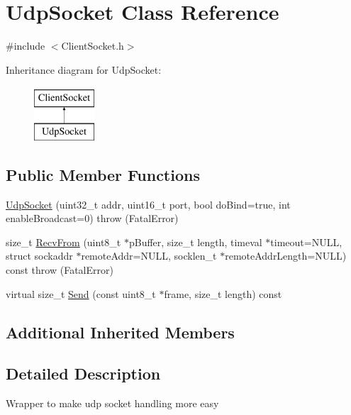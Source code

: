 \hypertarget{class_udp_socket}{\section{Udp\-Socket Class Reference}
\label{class_udp_socket}
}


{\ttfamily \#include $<$Client\-Socket.\-h$>$}

Inheritance diagram for Udp\-Socket\-:\begin{figure}[H]
\begin{center}
\leavevmode
\includegraphics[height=2.000000cm]{class_udp_socket}
\end{center}
\end{figure}
\subsection*{Public Member Functions}
\begin{DoxyCompactItemize}
\item 
\hyperlink{class_udp_socket_a017a02140e8618ce88f8d8c5a3bf2ba3}{Udp\-Socket} (uint32\-\_\-t addr, uint16\-\_\-t port, bool do\-Bind=true, int enable\-Broadcast=0)  throw (\-Fatal\-Error)
\item 
size\-\_\-t \hyperlink{class_udp_socket_a1391f69e42186e42966deb59c45f381f}{Recv\-From} (uint8\-\_\-t $\ast$p\-Buffer, size\-\_\-t length, timeval $\ast$timeout=N\-U\-L\-L, struct sockaddr $\ast$remote\-Addr=N\-U\-L\-L, socklen\-\_\-t $\ast$remote\-Addr\-Length=N\-U\-L\-L) const   throw (\-Fatal\-Error)
\item 
virtual size\-\_\-t \hyperlink{class_udp_socket_a434383e163f13643cff11a2cdf59961a}{Send} (const uint8\-\_\-t $\ast$frame, size\-\_\-t length) const 
\end{DoxyCompactItemize}
\subsection*{Additional Inherited Members}


\subsection{Detailed Description}
Wrapper to make udp socket handling more easy 


